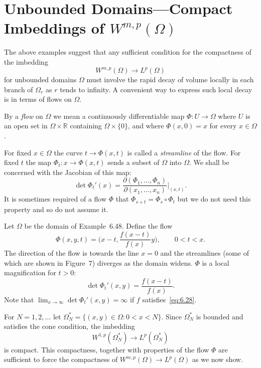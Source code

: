 \section{Unbounded Domains---Compact Imbeddings of
  \texorpdfstring{$W^{m,p}(\Omega)$}{W\textasciicircum\{m,p\}(Ω)}}

\begin{para}[Flows]
  The above examples suggest that any sufficient condition for the
  compactness of the imbedding
  \[ W^{m,p}(\Omega) \to L^p(\Omega) \]
  for unbounded domains $\Omega$ must involve the rapid decay
  of volume locally in each branch of $\Omega_r$ as $r$ tends to infinity.
  A convenient way to express such local decay is in terms of flows on $\Omega$.

  By a \emph{flow} on $\Omega$ we mean a continuously differentiable map
  $\Phi: U \to \Omega$ where $U$ is an open set in $\Omega\times\mathbb{R}$
  containing $\Omega \times \{0\}$, and where $\Phi(x,0)=x$ for every $x\in\Omega$.

  For fixed $x\in\Omega$ the curve $t\to \Phi(x,t)$ is called a \emph{streamline}
  of the flow. For fixed $t$ the map $\Phi_t: x\to \Phi(x,t)$ sends a subset
  of $\Omega$ into $\Omega$. We shall be concerned with the Jacobian of this map:
  \[ \det \Phi_t'(x) = \frac{\partial(\Phi_1,\ldots,\Phi_n)}{\partial(x_1,\ldots,x_n)}
      \bigg|_{(x,t)}.\]
  It is sometimes required of a flow $\Phi$ that $\Phi_{s+t} = \Phi_s\circ\Phi_t$
  but we do not need this property and so do not assume it.
\end{para}


\begin{example}
  Let $\Omega$ be the domain of Example~6.48. Define the flow
  \[ \Phi(x,y,t) = \biggl(x-t, \frac{f(x-t)}{f(x)}y\biggr), \qquad 0<t<x. \]
  The direction of the flow is towards the line $x=0$ and the streamlines (some
  of which are shown in Figure~7) diverges as the domain widens. $\Phi$ is a local
  magnification for $t>0$:
  \[ \det\Phi_t'(x,y) = \frac{f(x-t)}{f(x)}. \]
  Note that $\lim_{x\to\infty} \det\Phi_t'(x,y) = \infty$ if $f$ satisfies~\eqref{eq:6.28}.

  For $N=1,2,\ldots$ let $\Omega_N^* = \{(x,y)\in\Omega: 0<x<N\}$.
  Since $\Omega_N^*$ is bounded and satisfies the cone condition, the imbedding
  \[ W^{1,p}(\Omega_N^*) \to L^p(\Omega_N^*) \]
  is compact. This compactness, together with properties of the flow $\Phi$
  are sufficient to force the compactness of $W^{m,p}(\Omega)\to L^p(\Omega)$
  as we now show.
\end{example}


